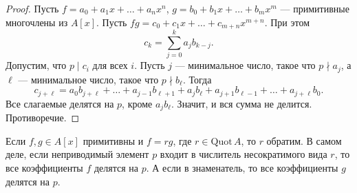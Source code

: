 \begin{proof}
    Пусть $f = a_0 + a_1x + \ldots + a_nx^n$, $g = b_0 + b_1x + \ldots + b_mx^m$ --- примитивные многочлены из $A[x]$. Пусть $fg = c_0 + c_1x + \ldots + c_{m + n}x^{m + n}$. При этом
    $$
    c_k = \sum_{j = 0}^ka_jb_{k - j}.
    $$
    Допустим, что $p \mid c_i$ для всех $i$. Пусть $j$ --- минимальное число, такое что $p \nmid a_j$, а $\ell$ --- минимальное число, такое что $p \nmid b_\ell$. Тогда
    $$
    c_{j + \ell} = a_0b_{j + \ell} + \ldots + a_{j - 1}b_{\ell + 1} + a_jb_\ell + a_{j + 1}b_{\ell - 1} + \ldots + a_{j + \ell}b_0.
    $$
    Все слагаемые делятся на $p$, кроме $a_jb_\ell$. Значит, и вся сумма не делится. Противоречие.
\end{proof}

\begin{remark}
    Если $f, g \in A[x]$ примитивны и $f = rg$, где $r \in \mathrm{Quot}\,A$, то $r$ обратим. В самом деле, если неприводимый элемент $p$ входит в числитель несократимого вида $r$, то все коэффициенты $f$ делятся на $p$. А если в знаменатель, то все коэффициенты $g$ делятся на $p$.
\end{remark}


